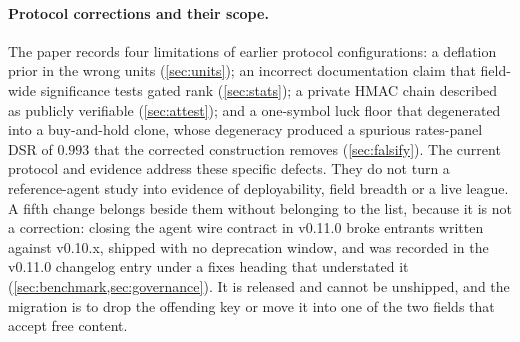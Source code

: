 \paragraph{Protocol corrections and their scope.} The paper records four limitations of earlier protocol configurations: a deflation prior in the wrong units (\cref{sec:units}); an incorrect documentation claim that field-wide significance tests gated rank (\cref{sec:stats}); a private HMAC chain described as publicly verifiable (\cref{sec:attest}); and a one-symbol luck floor that degenerated into a buy-and-hold clone, whose degeneracy produced a spurious rates-panel DSR of $0.993$ that the corrected construction removes (\cref{sec:falsify}). The current protocol and evidence address these specific defects. They do not turn a reference-agent study into evidence of deployability, field breadth or a live league. A fifth change belongs beside them without belonging to the list, because it is not a correction: closing the agent wire contract in v0.11.0 broke entrants written against v0.10.x, shipped with no deprecation window, and was recorded in the v0.11.0 changelog entry under a fixes heading that understated it (\cref{sec:benchmark,sec:governance}). It is released and cannot be unshipped, and the migration is to drop the offending key or move it into one of the two fields that accept free content.
